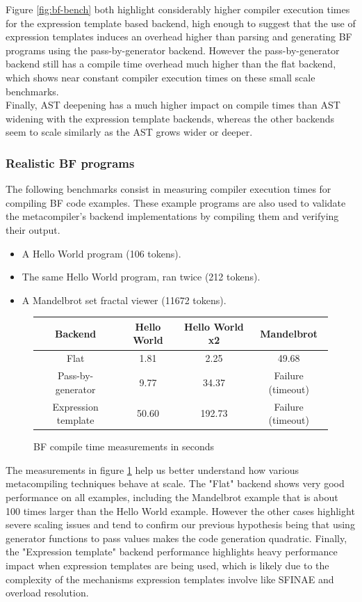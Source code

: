 \documentclass[../../main.tex]{subfiles}
\begin{document}
Figure \ref{fig:bf-bench}
both highlight considerably higher compiler execution times for the expression
template based backend, high enough to suggest that the use of expression
templates induces an overhead higher than parsing and generating BF programs
using the pass-by-generator backend. However the pass-by-generator backend still
has a compile time overhead much higher than the flat backend, which shows near
constant compiler execution times on these small scale benchmarks.\\

Finally, AST deepening has a much higher impact on compile times than AST
widening with the expression template backends, whereas the other backends seem
to scale similarly as the AST grows wider or deeper.

\subsubsection{Realistic BF programs}

The following benchmarks consist in measuring compiler execution times for
compiling BF code examples. These example programs are also used to validate the
metacompiler's backend implementations by compiling them and verifying their
output.

\begin{itemize}
\item A Hello World program (106 tokens).
\item The same Hello World program, ran twice (212 tokens).
\item A Mandelbrot set fractal viewer (11672 tokens).
\end{itemize}

\begin{figure}[h]
\begin{tabular}{|c|c|c|c|}
\hline
Backend             & Hello World & Hello World x2  & Mandelbrot \\
\hline
Flat                & 1.81        & 2.25            & 49.68 \\
Pass-by-generator   & 9.77        & 34.37           & Failure (timeout) \\
Expression template & 50.60       & 192.73          & Failure (timeout) \\
\hline
\end{tabular}
\caption{BF compile time measurements in seconds
}\label{fig:BF-compile-times}
\end{figure}

The measurements in figure \ref{fig:BF-compile-times} help us better understand
how various metacompiling techniques behave at scale. The "Flat" backend shows
very good performance on all examples, including the Mandelbrot example that is
about 100 times larger than the Hello World example. However the other cases
highlight severe scaling issues and tend to confirm our previous hypothesis
being that using generator functions to pass values makes the code generation
quadratic. Finally, the "Expression template" backend performance highlights
heavy performance impact when expression templates are being used, which is
likely due to the complexity of the mechanisms expression templates involve like
SFINAE and overload resolution.
\end{document}
